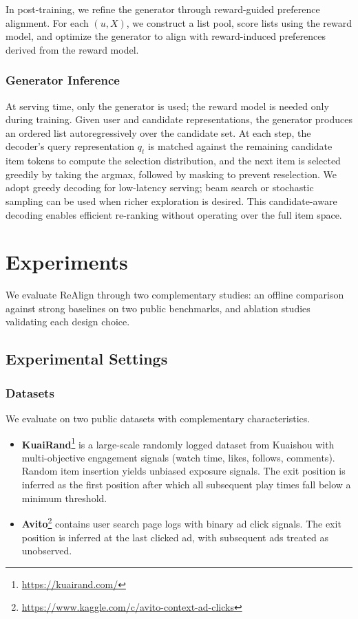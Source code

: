 \documentclass[sigconf]{acmart}
\begin{document}
In post-training, we refine the generator through reward-guided preference alignment. For each $(u, X)$, we construct a list pool, score lists using the reward model, and optimize the generator to align with reward-induced preferences derived from the reward model.

\subsubsection{Generator Inference}

At serving time, only the generator is used; the reward model is needed only during training. Given user and candidate representations, the generator produces an ordered list autoregressively over the candidate set. At each step, the decoder's query representation $q_t$ is matched against the remaining candidate item tokens to compute the selection distribution, and the next item is selected greedily by taking the argmax, followed by masking to prevent reselection. We adopt greedy decoding for low-latency serving; beam search or stochastic sampling can be used when richer exploration is desired. This candidate-aware decoding enables efficient re-ranking without operating over the full item space.


\section{Experiments}
We evaluate ReAlign through two complementary studies: an offline comparison against strong baselines on two public benchmarks, and ablation studies validating each design choice. 

\subsection{Experimental Settings}

\subsubsection{Datasets}
We evaluate on two public datasets with complementary characteristics.
\begin{itemize}
    \item \textbf{KuaiRand}\footnote{\url{https://kuairand.com/}} is a large-scale randomly logged dataset from Kuaishou with multi-objective engagement signals (watch time, likes, follows, comments). Random item insertion yields unbiased exposure signals. The exit position is inferred as the first position after which all subsequent play times fall below a minimum threshold.
    \item \textbf{Avito}\footnote{\url{https://www.kaggle.com/c/avito-context-ad-clicks}} contains user search page logs with binary ad click signals. The exit position is inferred at the last clicked ad, with subsequent ads treated as unobserved.
\end{itemize}
\end{document}
